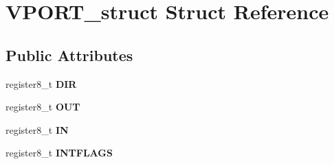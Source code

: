 \hypertarget{struct_v_p_o_r_t__struct}{}\section{V\+P\+O\+R\+T\+\_\+struct Struct Reference}
\label{struct_v_p_o_r_t__struct}
\subsection*{Public Attributes}
\begin{DoxyCompactItemize}
\item 
register8\+\_\+t {\bfseries D\+IR}\hypertarget{struct_v_p_o_r_t__struct_ae8fe5e80d081564b68412bc3546180ec}{}\label{struct_v_p_o_r_t__struct_ae8fe5e80d081564b68412bc3546180ec}

\item 
register8\+\_\+t {\bfseries O\+UT}\hypertarget{struct_v_p_o_r_t__struct_af1e9d35b409cae9317ca4efe44736ec4}{}\label{struct_v_p_o_r_t__struct_af1e9d35b409cae9317ca4efe44736ec4}

\item 
register8\+\_\+t {\bfseries IN}\hypertarget{struct_v_p_o_r_t__struct_ad0328b64874040f2c48ac748291584e0}{}\label{struct_v_p_o_r_t__struct_ad0328b64874040f2c48ac748291584e0}

\item 
register8\+\_\+t {\bfseries I\+N\+T\+F\+L\+A\+GS}\hypertarget{struct_v_p_o_r_t__struct_a808c432620513ead0ca8dc127715e24b}{}\label{struct_v_p_o_r_t__struct_a808c432620513ead0ca8dc127715e24b}

\end{DoxyCompactItemize}


